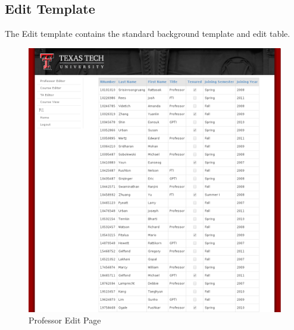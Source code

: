 \subsection{Edit Template}
The Edit template contains the standard background template and edit table.
\begin{figure}[H]
  	\centering
  	\includegraphics[scale=0.5]{ProfessorEditor.png}
    \caption{Professor Edit Page}
\end{figure}

\newpage
